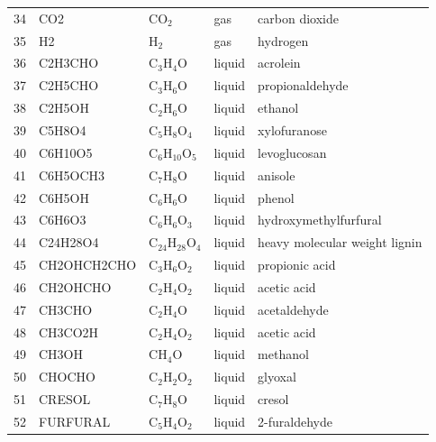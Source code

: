 \documentclass[12pt,titlepage]{article}
\begin{document}
\begin{center}
\begin{longtable}{cllll}
    34 & CO2            & CO$_2$                  & \cellcolor{purple!25}gas         & carbon dioxide \\
    35 & H2             & H$_2$                   & \cellcolor{purple!25}gas         & hydrogen \\
    36 & C2H3CHO        & C$_3$H$_4$O             & \cellcolor{blue!25}liquid        & acrolein \\
    37 & C2H5CHO        & C$_3$H$_6$O             & \cellcolor{blue!25}liquid        & propionaldehyde \\
    38 & C2H5OH         & C$_2$H$_6$O             & \cellcolor{blue!25}liquid        & ethanol \\
    39 & C5H8O4         & C$_5$H$_8$O$_4$         & \cellcolor{blue!25}liquid        & xylofuranose \\
    40 & C6H10O5        & C$_6$H$_{10}$O$_5$      & \cellcolor{blue!25}liquid        & levoglucosan \\
    41 & C6H5OCH3       & C$_7$H$_8$O             & \cellcolor{blue!25}liquid        & anisole \\
    42 & C6H5OH         & C$_6$H$_6$O             & \cellcolor{blue!25}liquid        & phenol \\
    43 & C6H6O3         & C$_6$H$_6$O$_3$         & \cellcolor{blue!25}liquid        & hydroxymethylfurfural \\
    44 & C24H28O4       & C$_{24}$H$_{28}$O$_4$   & \cellcolor{blue!25}liquid        & heavy molecular weight lignin \\
    45 & CH2OHCH2CHO    & C$_3$H$_6$O$_2$         & \cellcolor{blue!25}liquid        & propionic acid \\
    46 & CH2OHCHO       & C$_2$H$_4$O$_2$         & \cellcolor{blue!25}liquid        & acetic acid \\
    47 & CH3CHO         & C$_2$H$_4$O             & \cellcolor{blue!25}liquid        & acetaldehyde \\
    48 & CH3CO2H        & C$_2$H$_4$O$_2$         & \cellcolor{blue!25}liquid        & acetic acid \\
    49 & CH3OH          & CH$_4$O                 & \cellcolor{blue!25}liquid        & methanol \\
    50 & CHOCHO         & C$_2$H$_2$O$_2$         & \cellcolor{blue!25}liquid        & glyoxal \\
    51 & CRESOL         & C$_7$H$_8$O             & \cellcolor{blue!25}liquid        & cresol \\
    52 & FURFURAL       & C$_5$H$_4$O$_2$         & \cellcolor{blue!25}liquid        & 2-furaldehyde \\

\end{longtable}
\end{center}
\end{document}
